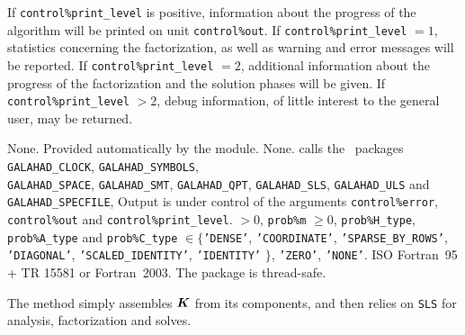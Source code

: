 \documentclass{galahad}
\newcommand{\packagename}{SSLS}
\begin{document}

\galinfo
If {\tt control\%print\_level} is positive, information about the progress
of the algorithm will be printed on unit {\tt control\-\%out}.
If {\tt control\%print\_level} $= 1$, statistics concerning the factorization,
as well as warning and error messages will be reported.
If {\tt control\%print\_level} $= 2$, additional information about the
progress of the factorization and the solution phases will be given.
If {\tt control\%print\_level} $> 2$, debug information, of little
interest to the general user, may be returned.


\galgeneral

\galcommon None.
\galworkspace Provided automatically by the module.
\galroutines None.
\galmodules {\tt \packagename\_solve} calls the \galahad\ packages
{\tt GALAHAD\_CLOCK},
{\tt GALAHAD\_SY\-M\-BOLS}, \\
{\tt GALAHAD\-\_SPACE},
{\tt GALAHAD\_SMT},
{\tt GALAHAD\_QPT},
{\tt GALAHAD\_SLS},
{\tt GALAHAD\_ULS} and
{\tt GALAHAD\_SPECFILE},
\galio Output is under control of the arguments
 {\tt control\%error}, {\tt control\%out} and {\tt control\%print\_level}.
 $> 0$, {\tt prob\%m} $\geq  0$,
{\tt prob\%H\_type}, {\tt prob\%A\_type}
and {\tt prob\%C\_type} $\in \{${\tt 'DENSE'},
 {\tt 'COORDINATE'}, {\tt 'SPARSE\_BY\_ROWS'}, {\tt 'DIAGONAL'},
 {\tt 'SCALED\_IDENTITY'}, {\tt 'IDENTITY'} $\}$,
 {\tt 'ZERO'}, {\tt 'NONE'}.
\galportability ISO Fortran~95 + TR 15581 or Fortran~2003.
The package is thread-safe.


\galmethod
The method simply assembles ${\bm{K}}$ from its components, and then relies
on {\tt SLS} for analysis, factorization and solves.

\end{document}
